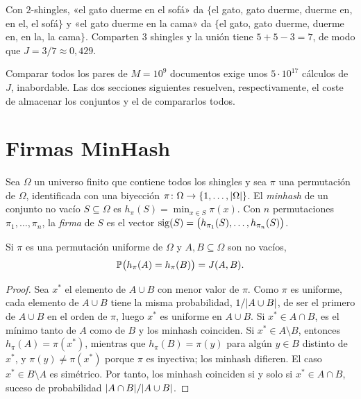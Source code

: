 \begin{ejemplo}\label{ej:jaccard}
Con $2$-shingles, «el gato duerme en el sofá» da $\{$el gato, gato duerme, duerme en, en el, el sofá$\}$ y «el gato duerme en la cama» da $\{$el gato, gato duerme, duerme en, en la, la cama$\}$. Comparten $3$ shingles y la unión tiene $5+5-3=7$, de modo que $J=3/7\approx 0{,}429$.
\end{ejemplo}

Comparar todos los pares de $M=10^{9}$ documentos exige unos $5\cdot 10^{17}$ cálculos de $J$, inabordable. Las dos secciones siguientes resuelven, respectivamente, el coste de almacenar los conjuntos y el de compararlos todos.

\section{Firmas MinHash}

\begin{definicion}[MinHash]
Sea $\Omega$ un universo finito que contiene todos los shingles y sea $\pi$ una permutación de $\Omega$, identificada con una biyección $\pi\colon\Omega\to\{1,\dots,\lvert\Omega\rvert\}$. El \emph{minhash} de un conjunto no vacío $S\subseteq\Omega$ es $h_\pi(S)=\min_{x\in S}\pi(x)$. Con $n$ permutaciones $\pi_1,\dots,\pi_n$, la \emph{firma} de $S$ es el vector $\operatorname{sig}(S)=\bigl(h_{\pi_1}(S),\dots,h_{\pi_n}(S)\bigr)$.
\end{definicion}

\begin{teorema}\label{teo:minhash}
Si $\pi$ es una permutación uniforme de $\Omega$ y $A,B\subseteq\Omega$ son no vacíos,
\[
\mathbb{P}\bigl(h_\pi(A)=h_\pi(B)\bigr)=J(A,B).
\]
\end{teorema}

\begin{proof}
Sea $x^{*}$ el elemento de $A\cup B$ con menor valor de $\pi$. Como $\pi$ es uniforme, cada elemento de $A\cup B$ tiene la misma probabilidad, $1/\lvert A\cup B\rvert$, de ser el primero de $A\cup B$ en el orden de $\pi$, luego $x^{*}$ es uniforme en $A\cup B$. Si $x^{*}\in A\cap B$, es el mínimo tanto de $A$ como de $B$ y los minhash coinciden. Si $x^{*}\in A\setminus B$, entonces $h_\pi(A)=\pi(x^{*})$, mientras que $h_\pi(B)=\pi(y)$ para algún $y\in B$ distinto de $x^{*}$, y $\pi(y)\neq\pi(x^{*})$ porque $\pi$ es inyectiva; los minhash difieren. El caso $x^{*}\in B\setminus A$ es simétrico. Por tanto, los minhash coinciden si y solo si $x^{*}\in A\cap B$, suceso de probabilidad $\lvert A\cap B\rvert/\lvert A\cup B\rvert$.
\end{proof}

